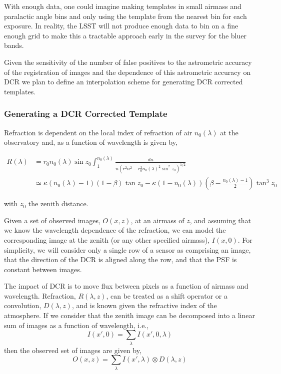 With enough data, one could imagine making templates in small airmass and
paralactic angle bins and only using the template from the nearest bin for
each exposure.  In reality, the LSST will not produce enough data to bin
on a fine enough grid to make this a tractable approach early in the survey
for the bluer bands.

Given the sensitivity of the number of false positives to the
astrometric accuracy of the registration of images and the dependence
of this astrometric accuracy on DCR we plan to define an interpolation
scheme for generating DCR corrected templates.

\subsubsection{Generating a DCR Corrected Template}

Refraction is dependent on the local index of refraction of air $n_0(\lambda)$ at the observatory and, as a function of wavelength is given by,

\begin{align}
R(\lambda) &= r_0 n_0(\lambda) \sin z_0 \int_1^{n_0(\lambda)} \frac{dn}{n \left(r^2n^2 -r_0^2n_0(\lambda)^2\sin^2z_0\right)^{1/2}} \nonumber\\
&\simeq \kappa (n_0(\lambda) - 1) (1 - \beta) \tan z_0 - \kappa (1 - n_0(\lambda)) \left(\beta - \frac{n_0(\lambda) - 1}{2}\right) \tan^3z_0
\end{align}

with $z_0$ the zenith distance.

Given a set of observed images, $O(x, z)$, at an airmass of $z$, and
assuming that we know the wavelength dependence of the refraction, we
can model the corresponding image at the zenith (or any other specified
airmass), $I(x, 0)$. For simplicity, we will consider only a single
row of a sensor as comprising an image, that the direction of the DCR
is aligned along the row, and that the PSF is constant between
images.

The impact of DCR is to move flux between pixels as a function of airmass and wavelength. Refraction, $R(\lambda, z)$, can be treated as a shift operator or a convolution, $D(\lambda, z)$, and is known given the refractive index of the atmosphere.  If we consider that the zenith image can be decomposed into a linear sum of images as a function of wavelength, i.e.,
\begin{equation}
I(x', 0) = \sum_\lambda I(x', 0, \lambda)
\end{equation}
then the observed set of images are given by,
\begin{equation}
O(x, z) = \sum_\lambda I(x',\lambda) \otimes D(\lambda, z)
\label{eq:convDCR}
\end{equation}

